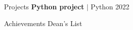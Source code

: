 \documentclass{resume} %
\begin{document}
\begin{rSection}{Projects}
{\textbf{Python project} $\vert$ Python} \hfill 2022 \\ 
\end{rSection}

\vspace{-0.2em}

\begin{rSection}{Achievements}
{Dean's List}\\ 
\end{rSection}

\end{document}
